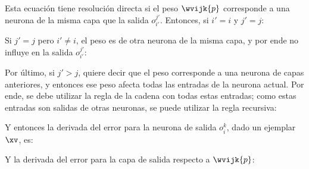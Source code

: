 

Esta ecuación tiene resolución directa si el peso $\wvijk{p}$ corresponde a una neurona de la misma capa que la salida $o_{i'}^{j'}$. Entonces, si $i'=i$ y $j'=j$:



Si $j'=j$ pero $i' \neq i$, el peso es de otra neurona de la misma capa, y por ende no influye en la salida  $o_{i'}^{j'}$:




Por último, si $j'>j$, quiere decir que el peso corresponde a una neurona de capas anteriores, y entonces ese peso afecta todas las entradas de la neurona actual. Por ende, se debe utilizar la regla de la cadena con todas estas entradas; como estas entradas son salidas de otras neuronas, se puede utilizar la regla recursiva: 
 
 
 
Y entonces la derivada del error para la neurona de salida $o_i^k$, dado un ejemplar $\xv$, es:


Y la derivada del error para la capa de salida respecto a $\wvijk{p}$:




